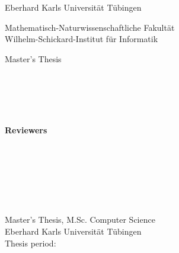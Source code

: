 
\begin{titlepage}
    \makeatletter
    \begin{center}
        \begin{LARGE}
            Eberhard Karls Universität Tübingen
        \end{LARGE}
        \begin{large}
            Mathematisch-Naturwissenschaftliche Fakultät \\
            Wilhelm-Schickard-Institut für Informatik
        \end{large}
        \vfill
        \begin{huge} 
            Master's Thesis
        \end{huge}
        \\\vspace{2cm}
        \begin{Large} \textbf{\@title} \end{Large}
        \\\vspace{1.5cm}
        \begin{large} \@author \end{large}
        \\\vspace{0.5cm}
        {\small \handindate}
        \vfill
        {\small \textbf{Reviewers}}
        \\
        \large{\firstReviewer}\\
        \footnotesize{\firstReviewerAffiliation}
        \\\vspace{0.5cm}
        \large{\secondReviewer}\\
        \footnotesize{\secondReviewerAffiliation}
    \end{center}
\end{titlepage}

\thispagestyle{empty}

\makeatletter
\vspace*{\fill}
\begin{flushleft}
\textbf{\@author}\\
\matrikelnummer\\
\emph{\@title}\\
Master's Thesis, M.Sc. Computer Science\\
Eberhard Karls Universität Tübingen\\
Thesis period: \thesisperiod
\end{flushleft}